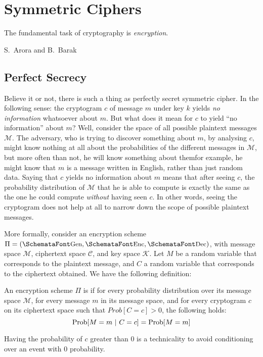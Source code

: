 
\chapter{Symmetric Ciphers}
\epigraph{The fundamental task of cryptography is \emph{encryption}.}{S.\ Arora and B.\ Barak}


\section{Perfect Secrecy}
  \label{sec:perf_sec}
  Believe it or not, there is such a thing as perfectly secret symmetric cipher. In the following sense: the cryptogram $c$ of message $m$ under key $k$ yields \emph{no information} whatsoever about $m$. But what does it mean for $c$ to yield ``no information'' about $m$? Well, consider the space of all possible plaintext messages $\mathcal{M}$. The adversary, who is trying to discover something about $m$, by analysing $c$, might know nothing at all about the probabilities of the different messages in $\mathcal{M}$, but more often than not, he will know something about them\emd for example, he might know that $m$ is a message written in English, rather than just random data. Saying that $c$ yields no information about $m$ means that after seeing $c$, the probability distribution of $\mathcal{M}$ that he is able to compute is exactly the same as the one he could compute \emph{without} having seen $c$. In other words, seeing the cryptogram does not help at all to narrow down the scope of possible plaintext messages.

  \medskip

  \noindent More formally, consider an encryption scheme $\Pi = (\myemph{Gen}, \myemph{Enc}, \myemph{Dec})$, with message space $\mathcal{M}$, ciphertext space $\mathcal{C}$, and key space $\mathcal{K}$. Let $M$ be a random variable that corresponds to the plaintext message, and $C$ a random variable that corresponds to the ciphertext obtained. We have the following definition:
  \begin{definition}
    \label{def:perf_sec}
    An encryption scheme $\Pi$ is  if for every probability distribution over its message space $\mathcal{M}$, for every message $m$ in its message space, and for every cryptogram $c$ on its ciphertext space such that $Prob[C=c] > 0$, the following holds:
    \begin{equation}
      \textup{Prob}[M = m\ |\ C =c] = \textup{Prob}[M = m]
    \end{equation}
  \end{definition}
  \noindent Having the probability of $c$ greater than $0$ is a technicality to avoid conditioning over an event with $0$ probability.

